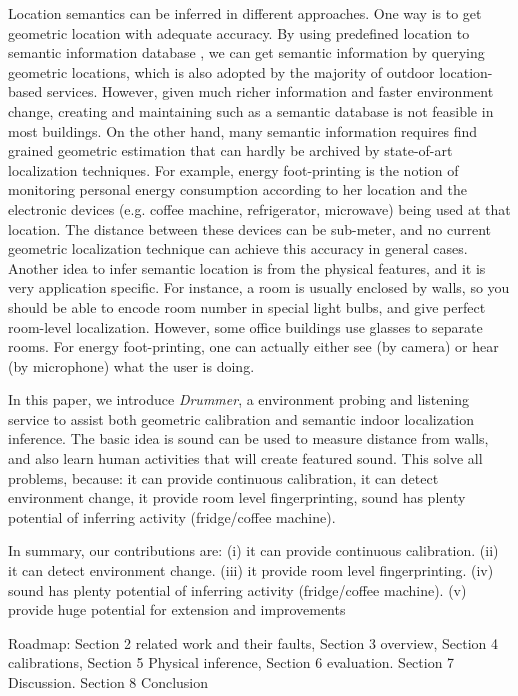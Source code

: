 Location semantics can be inferred in different approaches. One way is to get geometric location with 
adequate accuracy. By using predefined location to semantic information database \fxnote{[cite]}, we can get semantic information
by querying geometric locations, which is also adopted by the majority of outdoor location-based services.
However, given much richer information and faster environment change, creating and maintaining such as a
semantic database is not feasible in most buildings. On the other hand, many semantic information requires
find grained geometric estimation that can hardly be archived by state-of-art localization techniques. For 
example, energy foot-printing \fxnote{[cite]} is the notion of monitoring personal energy consumption
according to her location and 
the electronic devices (e.g. coffee machine, refrigerator, microwave) being used at that location. The 
distance between these devices can be sub-meter, and no current geometric localization technique can achieve this 
accuracy in general cases. Another idea to infer semantic location is from the physical features, and it is very application
specific. For instance, a room is usually enclosed by walls, so you should be able to encode room number in 
special light bulbs, and give perfect room-level localization. However, some office buildings use glasses to separate
rooms. %
For energy foot-printing, one can actually either see (by camera) or hear (by microphone) what the user is doing.



In this paper, we introduce {\em Drummer}, a environment probing and listening service 
to assist both geometric calibration and semantic indoor localization inference. The basic idea is sound 
can be used to measure distance from walls, and also learn human activities that will create featured sound.
This solve all problems, because: it can 
provide continuous calibration, it can detect environment change, 
it provide room level fingerprinting, sound has plenty potential of inferring activity (fridge/coffee machine).


In summary, our contributions are: (i) it can provide continuous calibration. (ii) it can detect environment change. 
(iii) it provide room level fingerprinting. (iv) sound has plenty potential of inferring activity (fridge/coffee machine).
(v) provide huge potential for extension and improvements

Roadmap: Section 2 related work and their faults, Section 3 overview, Section 4 calibrations, Section 5 Physical inference, 
Section 6 evaluation. Section 7 Discussion. Section 8 Conclusion

